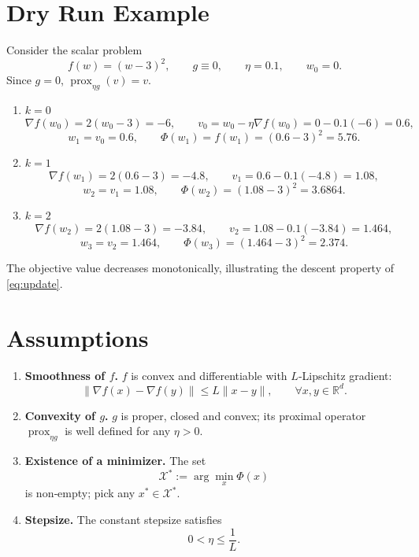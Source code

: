 \documentclass{article}
\begin{document}
\section*{Dry Run Example}
Consider the scalar problem 
\[
f(w)=(w-3)^{2},\qquad g\equiv0,\qquad \eta=0.1,\qquad w_{0}=0.
\]
Since $g=0$, $\operatorname{prox}_{\eta g}(v)=v$.

\begin{enumerate}[label=\textbf{Iter \arabic*:}]
\item $k=0$  
\[
\nabla f(w_{0})=2(w_{0}-3)=-6,\qquad 
v_{0}=w_{0}-\eta\nabla f(w_{0})=0-0.1(-6)=0.6,
\]
\[
w_{1}=v_{0}=0.6,\qquad \Phi(w_{1})=f(w_{1})=(0.6-3)^{2}=5.76.
\]

\item $k=1$  
\[
\nabla f(w_{1})=2(0.6-3)=-4.8,\qquad 
v_{1}=0.6-0.1(-4.8)=1.08,
\]
\[
w_{2}=v_{1}=1.08,\qquad \Phi(w_{2})=(1.08-3)^{2}=3.6864.
\]

\item $k=2$  
\[
\nabla f(w_{2})=2(1.08-3)=-3.84,\qquad 
v_{2}=1.08-0.1(-3.84)=1.464,
\]
\[
w_{3}=v_{2}=1.464,\qquad \Phi(w_{3})=(1.464-3)^{2}=2.374.
\]
\end{enumerate}
The objective value decreases monotonically, illustrating the descent property of \eqref{eq:update}.

\newpage

\section*{Assumptions}
\begin{enumerate}[label=\textbf{A\arabic*:}]
\item \label{A1} \textbf{Smoothness of $f$.} $f$ is convex and differentiable with $L$‑Lipschitz gradient:
\[
\|\nabla f(x)-\nabla f(y)\|\le L\|x-y\|,\qquad\forall x,y\in\mathbb{R}^{d}.
\]

\item \label{A2} \textbf{Convexity of $g$.} $g$ is proper, closed and convex; its proximal operator $\operatorname{prox}_{\eta g}$ is well defined for any $\eta>0$.

\item \label{A3} \textbf{Existence of a minimizer.} The set 
\[
\mathcal{X}^{*}:=\arg\min_{x}\Phi(x)
\]
is non‑empty; pick any $x^{*}\in\mathcal{X}^{*}$.

\item \label{A4} \textbf{Stepsize.} The constant stepsize satisfies
\[
0<\eta\le \frac{1}{L}.
\]
\end{enumerate}
\end{document}
